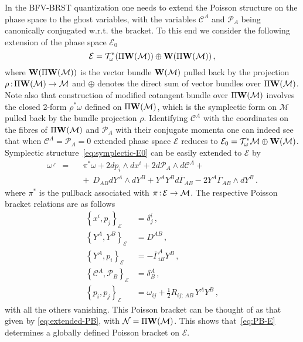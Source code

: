 \documentclass[a4paper,11pt]{amsart}
\numberwithin{thm}{section} %
\numberwithin{equation}{section} %
\numberwithin{figure}{section} %
\newcommand{\pb}[2]{\left\{{}#1{},{}#2{}\right\}}
\renewcommand{\:}{{\rm\, :\,}}
\def\bar{\overline}
\def\half{{\frac{1}{2}}}
\def\cP{{\mathcal P}}
\def\cc{{\mathcal C}}
\def\mod{{\mathcal T}^*_\omega}
\def\manM{{\mathcal M}}
\def\manN{{\mathcal N}}
\def\E{{ \mathcal E}}
\def\W{{\bf W}}
\def\con{{\bar\Gamma}}
\begin{document}
In the BFV-BRST quantization one needs to extend the Poisson structure
on the phase space to the ghost variables, with the variables
$\cc^A$ and $\cP_A$ being canonically conjugated w.r.t.
the bracket.  To this end we consider the following extension of the phase
space $\E_0$
\begin{equation}
  \label{eq:extended-E}
\E=\mod(\Pi\W(\manM))\oplus \W(\Pi\W(\manM))\,,
\end{equation}
where $\W(\Pi\W(\manM))$ is the vector bundle $\W(\manM)$ pulled back by
the projection $\rho\: \Pi\W(\manM) \to \manM$ and 
$\oplus$ denotes the direct sum of vector bundles over
$\Pi\W(\manM)$.  Note also that construction of modified cotangent
bundle over $\Pi\W(\manM)$ involves the closed 2-form $\rho^*\omega$
defined on $\Pi\W(\manM)$, which is the symplectic form on $\manM$
pulled back by the bundle projection $\rho$.
Identifying $\cc^A$ with the coordinates on the fibres of
$\Pi\W(\manM)$ and $\cP_A$ with their conjugate momenta one can indeed
see that when $\cc^A=\cP_A=0$ extended phase space $\E$ reduces to
$\E_0=\mod\manM\oplus \W(\manM)$. Symplectic
structure~\eqref{eq:symplectic-E0} can be easily extended to $\E$ by
\begin{equation}
\label{eq:symplectic-E}
\begin{aligned}
\omega^{\,_{\E}}~~=~~~&\pi^*\omega+2dp_i \wedge dx^i+2d\cP_A \wedge d\cc^A+\\
&+~~D_{AB}dY^A\wedge dY^B +
Y^A Y^B d \con_{AB}
-2Y^A\con_{AB} \wedge dY^B\,.
\end{aligned}
\end{equation}
where $\pi^*$ is the pullback associated with $\pi\: \E \to \manM$.
The respective Poisson bracket relations are as follows
\begin{equation}
  \begin{split}
    \pb{x^i}{p_j}_{\E}&=\delta^i_j\,, \\
    \pb{Y^A}{Y^B}_{\E}&=D^{AB}\,,\\
    \pb{Y^A}{p_i}_{\E}&=-\con^A_{iB}Y^B\,,\\
    \pb{\cc^A}{\cP_B}_{\E}&=\delta^A_B\,, \\
    \pb{p_i}{p_j}_{\E}&=\omega_{ij}+{\half}R_{ij;\,AB\,}Y^AY^B\,,
  \end{split}
  \label{eq:PB-E}
\end{equation}
with all the others vanishing.  This Poisson bracket can be thought
of as that given by \eqref{eq:extended-PB}, with $\manN=\Pi\W(\manM)$.
This shows that~\eqref{eq:PB-E} determines a globally defined Poisson
bracket on $\E$.
\end{document}
